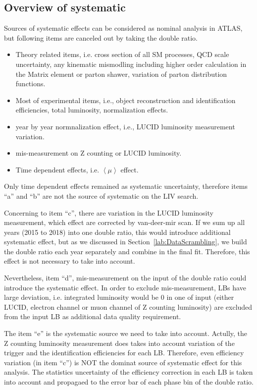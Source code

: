 \subsection{Overview of systematic}
\label{lab:Systematic_overvies}

Sources of systematic effects can be considered as nominal analysis in ATLAS, but following items are canceled out by taking the double ratio. 

\begin{itemize}
\item[a] Theory related items, i.e. cross section of all SM processes, QCD scale uncertainty, any kinematic mismodling including higher order calculation in the Matrix element or parton shawer, variation of parton distribution functions. 
\item[b] Most of experimental items, i.e., object reconstruction and identification efficiencies, total luminosity, normalization effects.
\item[c] year by year normnalization effect, i.e., LUCID luminosity measurement variation.
\item[d] mis-measurement on Z counting or LUCID luminosity. 
\item[e] Time dependent effects, i.e.  $\left< \mu \right>$ effect.

\end{itemize}

Only time dependent effects remained as systematic uncertainty, therefore items ``a'' and ``b'' are not the source of systematic on the LIV search.

Concerning to item ``c'', there are variation in the LUCID luminosity measurement, which effect are corrected by van-deer-mir scan. If we sum up all years (2015 to 2018) into one double ratio, this would introduce additional systematic effect, but as we discussed in Section~\ref{lab:DataScrambling}, we build the double ratio each year separately and combine in the final fit. Therefore, this effect is not necessary to take into account.

Nevertheless, item ``d'', mis-measurement on the input of the double ratio could introduce the systematic effect. In order to exclude mis-measurement, LBs have large deviation, i.e. integrated luminosity would be 0 in one of input (either LUCID, electron channel or muon channel of Z counting luminosity) are excluded from the input LB as additional data quality requirement. 


The item ``e'' is the systematic source we need to take into account. Actully, the Z counting luminosity measurement does takes into account variation of the trigger and the identification  efficiencies for each LB. 
Therefore, even efficiency variation (in item ``c'') is NOT the dominat source of systematic effect for this analysis.  The statistics uncertainty of 
the efficiency correction in each LB is taken into account and propagaed to the error bar of each phase bin of the double ratio. 

